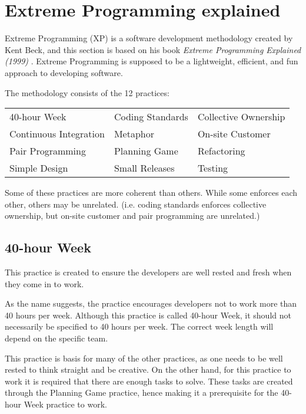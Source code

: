 \section{Extreme Programming explained}
Extreme Programming (XP) is a software development methodology created by Kent Beck, and this section is based on his book \textit{Extreme Programming Explained (1999)} \citep{xp:explained}. 
Extreme Programming is supposed to be a lightweight, efficient, and fun approach to developing software.

\noindent The methodology consists of the 12 practices:

\begin{tabularx}{\textwidth}{X X X}
	40-hour Week				 & Coding Standards & Collective Ownership \\
	Continuous Integration	  & Metaphor         	 & On-site Customer     \\
	Pair Programming			& Planning Game		& Refactoring          \\
	Simple Design          		  & Small Releases   	& Testing             
\end{tabularx}

Some of these practices are more coherent than others. 
While some enforces each other, others may be unrelated. (i.e. coding standards enforces collective ownership, but on-site customer and pair programming are unrelated.)

\subsection{40-hour Week}
This practice is created to ensure the developers are well rested and fresh when they come in to work.

As the name suggests, the practice encourages developers not to work more than 40 hours per week. 
Although this practice is called 40-hour Week, it should not necessarily be specified to 40 hours per week.
The correct week length will depend on the specific team.

This practice is basis for many of the other practices, as one needs to be well rested to think straight and be creative.
On the other hand, for this practice to work it is required that there are enough tasks to solve.
These tasks are created through the Planning Game practice, hence making it a prerequisite for the 40-hour Week practice to work. 

